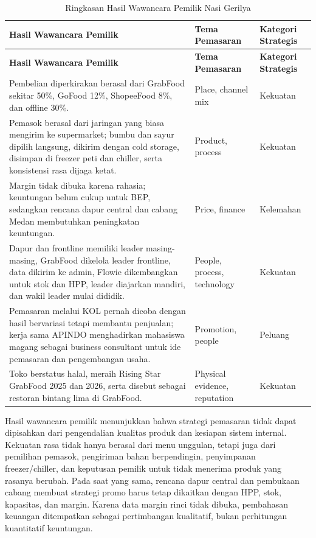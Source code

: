\begingroup
    \scriptsize
    \begin{xltabular}{\textwidth}{|Y|Z{2.6cm}|Z{2.3cm}|}
        \caption{Ringkasan Hasil Wawancara Pemilik Nasi Gerilya}
        \label{tab:koding-pemilik-bab4}\\
        \toprule
        \textbf{Hasil Wawancara Pemilik} & \textbf{Tema Pemasaran} & \textbf{Kategori Strategis} \\ \hline
        \midrule
        \endfirsthead
        \toprule
        \textbf{Hasil Wawancara Pemilik} & \textbf{Tema Pemasaran} & \textbf{Kategori Strategis} \\ \hline
        \midrule
        \endhead
        \endfoot
        \bottomrule
        \endlastfoot
        Pembelian diperkirakan berasal dari GrabFood sekitar 50\%, GoFood 12\%, ShopeeFood 8\%, dan offline 30\%. & Place, channel mix & Kekuatan \\ \hline
        Pemasok berasal dari jaringan yang biasa mengirim ke supermarket; bumbu dan sayur dipilih langsung, dikirim dengan cold storage, disimpan di freezer peti dan chiller, serta konsistensi rasa dijaga ketat. & Product, process & Kekuatan \\ \hline
        Margin tidak dibuka karena rahasia; keuntungan belum cukup untuk BEP, sedangkan rencana dapur central dan cabang Medan membutuhkan peningkatan keuntungan. & Price, finance & Kelemahan \\ \hline
        Dapur dan frontline memiliki leader masing-masing, GrabFood dikelola leader frontline, data dikirim ke admin, Flowie dikembangkan untuk stok dan HPP, leader diajarkan mandiri, dan wakil leader mulai dididik. & People, process, technology & Kekuatan \\ \hline
        Pemasaran melalui KOL pernah dicoba dengan hasil bervariasi tetapi membantu penjualan; kerja sama APINDO menghadirkan mahasiswa magang sebagai business consultant untuk ide pemasaran dan pengembangan usaha. & Promotion, people & Peluang \\ \hline
        Toko berstatus halal, meraih Rising Star GrabFood 2025 dan 2026, serta disebut sebagai restoran bintang lima di GrabFood. & Physical evidence, reputation & Kekuatan \\ \hline
    \end{xltabular}
\endgroup

Hasil wawancara pemilik menunjukkan bahwa strategi pemasaran tidak dapat dipisahkan dari pengendalian kualitas produk dan kesiapan sistem internal. Kekuatan rasa tidak hanya berasal dari menu unggulan, tetapi juga dari pemilihan pemasok, pengiriman bahan berpendingin, penyimpanan freezer/chiller, dan keputusan pemilik untuk tidak menerima produk yang rasanya berubah. Pada saat yang sama, rencana dapur central dan pembukaan cabang membuat strategi promo harus tetap dikaitkan dengan HPP, stok, kapasitas, dan margin. Karena data margin rinci tidak dibuka, pembahasan keuangan ditempatkan sebagai pertimbangan kualitatif, bukan perhitungan kuantitatif keuntungan.

